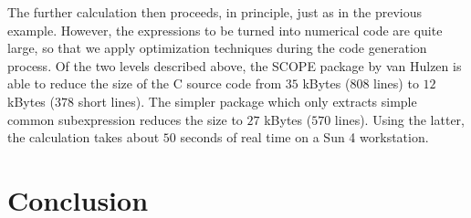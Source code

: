 \documentclass[12pt,a4paper]{article}
\newcommand{\OCCAL}{{\sf\bf OCCAL}}
\newcommand{\C}{{\sf C}}
\newcommand{\SCOPE}{{\sf SCOPE}}
\begin{document}
The further calculation then proceeds, in principle, just as in the
previous example. However, the expressions to be turned into numerical
code are quite large, so that we apply optimization techniques during
the code generation process. Of the two levels described above, the
\SCOPE{} package by van Hulzen \cite{scope} is able to reduce the size
of the \C{} source code from $35$ kBytes ($808$ lines) to $12$ kBytes
($378$ short lines). The simpler package which only extracts simple
common subexpression reduces the size to $27$ kBytes ($570$ lines).
Using the latter, the calculation takes about $50$ seconds of real time
on a Sun 4 workstation.

% 
% 



\section{Conclusion}
\end{document}
